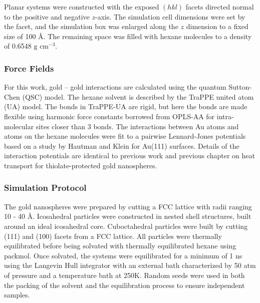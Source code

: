 Planar systems were constructed with the exposed $(hkl)$ facets
directed normal to the positive and negative $z$-axis.  The simulation
cell dimensions were set by the facet, and the simulation box was
enlarged along the $z$ dimension to a fixed size of 100 \AA.  The
remaining space was filled with hexane molecules to a density of
0.6548 $\text{g cm}^{-3}$.


\subsubsection{Force Fields}

For this work, gold -- gold interactions are calculated using the
quantum Sutton-Chen (QSC) model.\cite{Qi:1999ph} The hexane solvent is
described by the TraPPE united atom (UA)
model.\cite{TraPPE-UA.alkanes} The bonds in TraPPE-UA are rigid, but
here the bonds are made flexible using harmonic force constants
borrowed from OPLS-AA for intra-molecular sites closer than 3
bonds.\cite{Jorgensen98a} The interactions between Au atoms and atoms
on the hexane molecules were fit to a pairwise Lennard-Jones
potentials based on a study by Hautman and Klein for Au(111)
surfaces.\cite{hautman:4994} Details of the interaction potentials are
identical to previous work and previous chapter on heat 
transport for thiolate-protected gold nanospheres.\cite{Stocker2016}

\subsubsection{Simulation Protocol}
The gold nanospheres were prepared by cutting a FCC lattice with radii ranging
10 - 40 \AA. 
Icosahedral particles were
constructed in nested shell structures, built around an ideal
icosahedral core.  Cuboctahedral particles were built by cutting (111)
and (100) facets from a FCC lattice.
All particles were thermally equilibrated before being
solvated with thermally equilibrated hexane using packmol.\cite{packmol}
Once solvated, the systems were equilibrated for a minimum of 1 ns 
using the Langevin Hull 
integrator with an external bath characterized by 50 atm of
pressure and a temperature bath at 250K.\cite{Vardeman2011}
Random seeds were used in both the packing of the solvent and the equilibration process to ensure independent samples.

